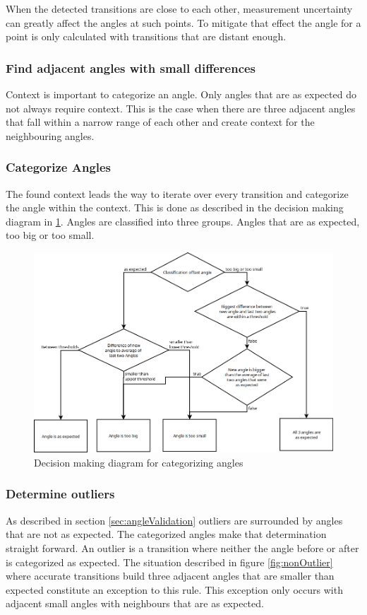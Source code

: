 When the detected transitions are close to each other, measurement uncertainty can greatly affect the angles at such points. To mitigate that effect the angle for a point is only calculated with transitions that are distant enough.
\subsubsection{Find adjacent angles with small differences}
Context is important to categorize an angle. Only angles that are as expected do not always require context. This is the case when there are three adjacent angles that fall within a narrow range of each other and create context for the neighbouring angles.

\subsubsection{Categorize Angles}
The found context leads the way to iterate over every transition and categorize the angle within the context. This is done as described in the decision making diagram in \ref{fig:decisionMaking}. Angles are classified into three groups. Angles that are as expected, too big or too small. 

\begin{figure}[H]
	\centering
	\includegraphics[width=.9\linewidth]{images/angleclassification.png}
	\caption{Decision making diagram for categorizing angles}
	\label{fig:decisionMaking}
\end{figure}
\subsubsection{Determine outliers}
As described in section \ref{sec:angleValidation} outliers are surrounded by angles that are not as expected. The categorized angles make that determination straight forward. An outlier is a transition where neither the angle before or after is categorized as expected. 
The situation described in figure \ref{fig:nonOutlier} where accurate transitions build three adjacent angles that are smaller than expected constitute an exception to this rule. This exception only occurs with adjacent small angles with neighbours that are as expected. 
